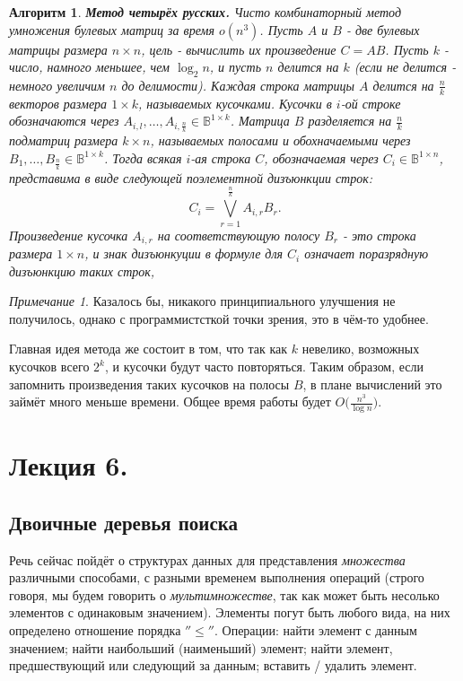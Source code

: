\documentclass[a4paper]{article}
\theoremstyle{indented}
\newtheorem{alg}{Алгоритм}
\theoremstyle{definition}
\theoremstyle{remark}
\newtheorem{remark}{Примечание}
\begin{document}
\begin{alg}
    \textbf{Метод четырёх русских.} Чисто комбинаторный метод умножения булевых матриц за время $o(n^3)$. Пусть $A$ и $B$ - две булевых матрицы размера $n\times n$, цель - вычислить их произведение $C=AB$. Пусть $k$ - число, намного меньшее, чем $\log_2 n$, и пусть $n$ делится на $k$ (если не делится - немного увеличим $n$ до делимости). Каждая строка матрицы $A$ делится на $\frac{n}{k}$ векторов размера $1\times k$, называемых \textit{кусочками}. Кусочки в $i$-ой строке обозначаются через $A_{i, l}, \ldots, A_{i, \frac{n}{k}}\in \mathbb{B}^{1\times k}$. Матрица $B$ разделяется на $\frac{n}{k}$ подматриц размера $k\times n$, называемых \textit{полосами} и обохначаемыми через $B_1, \ldots, B_{\frac{n}{k}}\in \mathbb{B}^{1\times k}$. Тогда всякая $i$-ая строка $C$, обозначаемая через $C_i\in \mathbb{B}^{1\times n}$, представима в виде следующей поэлементной дизъюнкции строк:
    \[
        C_i=\bigvee_{r=1}^{\frac{n}{k}}A_{i, r}B_r. 
    \]
    Произведение кусочка $A_{i, r}$ на соответствующую полосу $B_r$ - это строка размера $1\times n$, и знак дизъюнкуции в формуле для $C_i$ означает поразрядную дизъюнкцию таких строк,
\end{alg}

\begin{remark}
    Казалось бы, никакого принципиального улучшения не получилось, однако с программистсткой точки зрения, это в чём-то удобнее. \ 

    Главная идея метода же состоит в том, что так как $k$ невелико, возможных кусочков всего $2^k$, и кусочки будут часто повторяться. Таким образом, если запомнить произведения таких кусочков на полосы $B$, в плане вычислений это займёт много меньше времени. Общее время работы будет $O\biggl(\frac{n^3}{\log n}\biggr)$. 
\end{remark}

\section{Лекция 6.}

\subsection{Двоичные деревья поиска}

Речь сейчас пойдёт о структурах данных для представления \textit{множества} различными способами, с разными временем выполнения операций (строго говоря, мы будем говорить о \textit{мультимножестве}, так как может быть несолько элементов с одинаковым значением). Элементы погут быть любого вида, на них определено отношение порядка $''\leq''$. Операции: найти элемент с данным значением; найти наибольший (наименьший) элемент; найти элемент, предшествующий или следующий за данным; вставить / удалить элемент. \\
\end{document}
